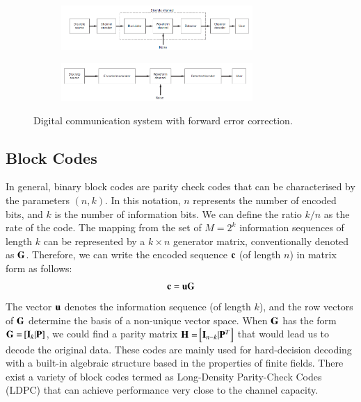 \documentclass[12pt,a4paper,openright]{report}
\begin{document}
  \begin{figure}[H]
  \centering
 	\begin{subfigure}[H]{1\textwidth}
  \centering
     \includegraphics[width=0.8\textwidth]{chancodtx.PNG}
     \label{fig:ChanCodTX}
 
 	\end{subfigure}
 	\quad
 
 	\begin{subfigure}[H]{1\textwidth}
  	\centering
	     \includegraphics[width=0.8\textwidth]{chancodrx.PNG}
     \label{fig:ChanCodRX}
  	\end{subfigure}
     \caption[Digital communication system with forward error correction]{Digital communication system with forward error correction\cite{HaykinBook}.}
     \label{fig:ChanCoding}
 \end{figure}
 
 
 \subsection{Block Codes} 
 In general, binary block codes  are parity check codes that can be characterised by the parameters $(n,k)$. In this notation, $n$ represents the number of encoded bits, and $k$ is the number of information bits. We can define the ratio $k/n$ as the rate of the code. The mapping from the set of $M=2^k$ information sequences of length $k$ can be represented by a $k\times n$ generator matrix, conventionally denoted as $\bf{G}$. Therefore, we can write the encoded sequence $\bf{c}$ (of length $n$) in matrix form as follows:
\begin{equation}
 {\bf{c}} ={{\bf{u}}}{\bf{G}}
 \end{equation}
The vector  $\bf{u}$ denotes the information sequence (of length $k$), and the row vectors of $\bf{G}$ determine the basis of a non-unique vector space. When $\bf{G}$ has the form ${\bf{G = }}\left[ {{{\bf{I}}_k}{\bf{|P}}} \right]$, we could find a parity matrix ${\bf{H = }}\left[ {{{\bf{I}}_{n - k}}{\bf{|}}{{\bf{P}}^T}} \right]$ that would lead us to decode the original data\cite{SklarBook}. These codes are mainly used for hard-decision decoding with a built-in algebraic structure based in the properties of finite fields. There exist a variety of block codes termed as Long-Density Parity-Check Codes (LDPC) that can achieve performance very close to the channel capacity.  
\end{document}
